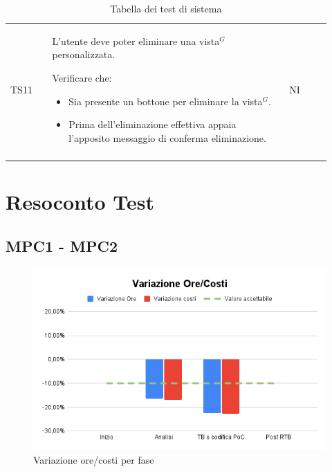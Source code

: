 \begin{longtable}{p{0.12\linewidth}p{0.68\linewidth}p{0.12\linewidth}}
    \rowcolor[RGB]{233, 245, 206}
    TS11 &
    L'utente deve poter eliminare una vista$^{G}$ personalizzata. \par
    Verificare che:
    \begin{itemize}
        \item Sia presente un bottone per eliminare la vista$^{G}$.
        \item Prima dell'eliminazione effettiva appaia l'apposito messaggio di conferma eliminazione.
    \end{itemize}&
    NI \\

    \caption{Tabella dei test di sistema}
\end{longtable}	 

\newpage
\section{Resoconto Test}
\subsection{MPC1 - MPC2}
\begin{figure}[h!]
    \centering
    \includegraphics[scale=0.65]{../../assets/Variazione_ore-costi.png}
    \caption{Variazione ore/costi per fase}
\end{figure}

